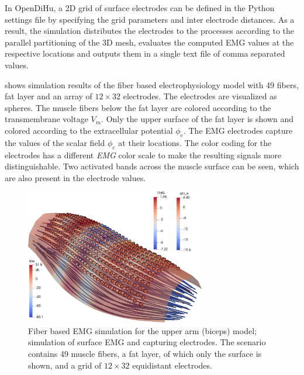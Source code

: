 In OpenDiHu, a 2D grid of surface electrodes can be defined in the Python settings file by specifying the grid parameters and inter electrode distances. As a result, the simulation distributes the electrodes to the processes according to the parallel partitioning of the 3D mesh, evaluates the computed EMG values at the respective locations and outputs them in a single text file of comma separated values.

 shows simulation results of the fiber based electrophysiology model with 49 fibers, fat layer and an array of $12\times 32$ electrodes. The electrodes are visualized as spheres. The muscle fibers below the fat layer are colored according to the transmembrane voltage $V_m$. Only the upper surface of the fat layer is shown and colored according to the extracellular potential $\phi_e$. The EMG electrodes capture the values of the scalar field $\phi_e$ at their locations. The color coding for the electrodes has a different \emph{EMG} color scale to make the resulting signals more distinguishable. Two activated bands across the muscle surface can be seen, which are also present in the electrode values.

\begin{figure}
  \centering%
  \includegraphics[width=0.7\textwidth]{images/results/application/fibers_fat_emg2.png}%
  \caption{Fiber based EMG simulation for the upper arm (biceps) model; simulation of surface EMG and capturing electrodes. The scenario contains 49 muscle fibers, a fat layer, of which only the surface is shown, and a grid of $12 \times 32$ equidistant electrodes.}%
  \label{fig:fibers_fat_emg2_electrodes}%
\end{figure}

